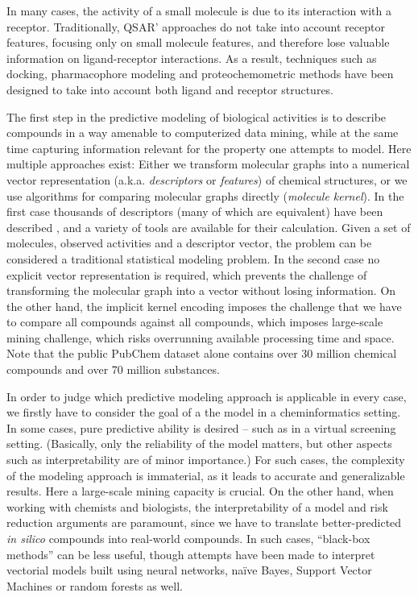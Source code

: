 \documentclass{sig-alternate}
\begin{document}
In many cases, the activity of a small molecule is due to its
interaction with a receptor. Traditionally, QSAR' \cite{Hansch:1962vn,
  Free:1964ys} approaches do not take into account receptor features,
focusing only on small molecule features, and therefore lose valuable
information on ligand-receptor interactions. As a result, techniques
such as docking, pharmacophore modeling and proteochemometric methods
have been designed to take into account both ligand and receptor
structures.

The first step in the predictive modeling of biological activities is
to describe compounds in a way amenable to computerized data mining,
while at the same time capturing information relevant for the property
one attempts to model. Here multiple approaches exist: Either we
transform molecular graphs into a numerical vector representation
(a.k.a. \emph{descriptors} or \emph{features}) of chemical structures,
or we use algorithms for comparing molecular graphs directly
(\emph{molecule kernel}). In the first case thousands of descriptors
(many of which are equivalent) have been described
\cite{todeschini2000}, and a variety of tools are available for their
calculation. Given a set of molecules, observed activities and a
descriptor vector, the problem can be considered a traditional
statistical modeling problem. In the second case no explicit vector
representation is required, which prevents the challenge of
transforming the molecular graph into a vector without losing
information. On the other hand, the implicit kernel encoding imposes
the challenge that we have to compare all compounds against all
compounds, which imposes large-scale mining challenge, which risks
overrunning available processing time and space. Note that the public
PubChem dataset alone contains over 30 million chemical compounds and
over 70 million substances.

In order to judge which predictive modeling approach is applicable in
every case, we firstly have to consider the goal of a the model in a
cheminformatics setting. In some cases, pure predictive ability is
desired -- such as in a virtual screening setting. (Basically, only
the reliability of the model matters, but other aspects such as
interpretability are of minor importance.) For such cases, the
complexity of the modeling approach is immaterial, as it leads to
accurate and generalizable results. Here a large-scale mining capacity
is crucial. On the other hand, when working with chemists and
biologists, the interpretability of a model and risk reduction
arguments are paramount, since we have to translate better-predicted
\emph{in silico} compounds into real-world compounds. In such cases,
``black-box methods'' can be less useful, though attempts have been
made to interpret vectorial models built using neural networks,
na\"{i}ve Bayes, Support Vector Machines or random forests as well.
\end{document}
